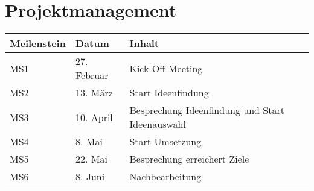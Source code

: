 \section{Projektmanagement}


\begin{table}
	\begin{tabular}{l l l}
		\hline
		\textbf{Meilenstein} & \textbf{Datum} & \textbf{Inhalt} \\
		\hline
		MS1 & 27. Februar & Kick-Off Meeting \\
		MS2	& 13. März & Start Ideenfindung \\
		MS3	& 10. April & Besprechung Ideenfindung und Start Ideenauswahl \\
		MS4	& 8.  Mai & Start Umsetzung \\
		MS5	& 22. Mai & Besprechung erreichert Ziele \\
		MS6	& 8.  Juni & Nachbearbeitung \\
		\hline
	\end{tabular}
\end{table}